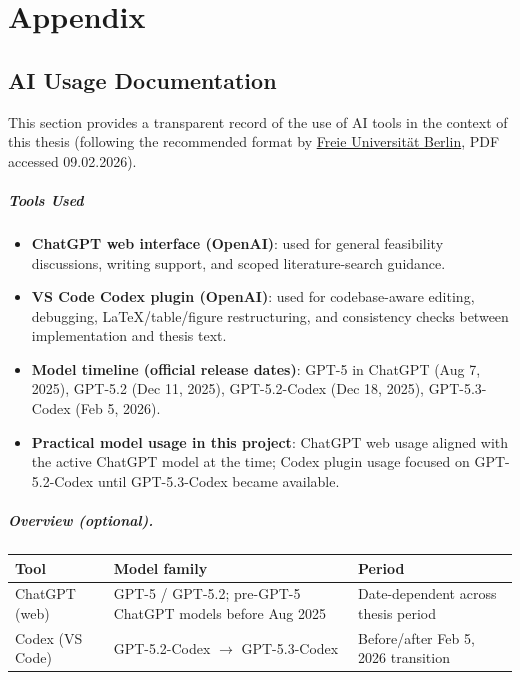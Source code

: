 \chapter{Appendix}

\section{AI Usage Documentation}
This section provides a transparent record of the use of AI tools in the context of this thesis (following the recommended format by \href{https://www.imp.fu-berlin.de/fbv/pruefungsbuero/Informationen-Anleitungen-FAQ/Informationen-und-Anleitungen/Handreichung-KI-Nutzung-Informatik.pdf}{Freie Universität Berlin}, PDF accessed 09.02.2026).

\paragraph*{Tools Used}
\begin{itemize}
  \item \textbf{ChatGPT web interface (OpenAI)}: used for general feasibility discussions, writing support, and scoped literature-search guidance.
  \item \textbf{VS Code Codex plugin (OpenAI)}: used for codebase-aware editing, debugging, LaTeX/table/figure restructuring, and consistency checks between implementation and thesis text.
  \item \textbf{Model timeline (official release dates)}:
        GPT-5 in ChatGPT (Aug 7, 2025), GPT-5.2 (Dec 11, 2025), GPT-5.2-Codex (Dec 18, 2025), GPT-5.3-Codex (Feb 5, 2026).
  \item \textbf{Practical model usage in this project}: ChatGPT web usage aligned with the active ChatGPT model at the time; Codex plugin usage focused on GPT-5.2-Codex until GPT-5.3-Codex became available.
\end{itemize}

\paragraph{Overview (optional).}
\begin{center}
  \small
  \begin{tabular}{@{}p{}p{}p{}@{}}
    \toprule
    \textbf{Tool}   & \textbf{Model family}                                     & \textbf{Period}                     \\
    \midrule
    ChatGPT (web)   & GPT-5 / GPT-5.2; pre-GPT-5 ChatGPT models before Aug 2025 & Date-dependent across thesis period \\
    Codex (VS Code) & GPT-5.2-Codex \(\rightarrow\) GPT-5.3-Codex               & Before/after Feb 5, 2026 transition \\
    \bottomrule
  \end{tabular}
  \normalsize
\end{center}

